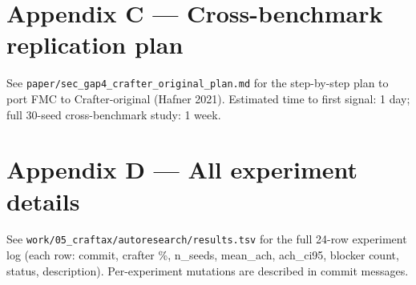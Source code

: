 \documentclass[11pt,letterpaper]{article}
\begin{document}
\section{Appendix C — Cross-benchmark replication plan}

See \texttt{paper/sec\_gap4\_crafter\_original\_plan.md} for the step-by-step plan
to port FMC to Crafter-original (Hafner 2021). Estimated time to first
signal: 1 day; full 30-seed cross-benchmark study: 1 week.

\section{Appendix D — All experiment details}

See \texttt{work/05\_craftax/autoresearch/results.tsv} for the full 24-row
experiment log (each row: commit, crafter \%, n\_seeds, mean\_ach,
ach\_ci95, blocker count, status, description). Per-experiment
mutations are described in commit messages.





\end{document}
